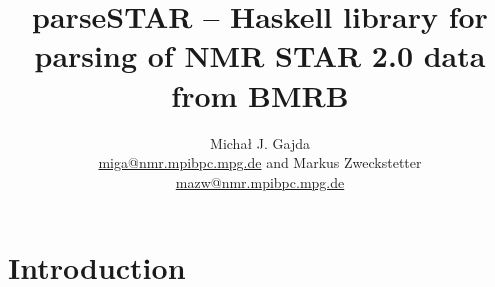 \documentclass[font=Times]{article}
\author{Micha\l{} J. Gajda\\\url{miga@nmr.mpibpc.mpg.de} and
Markus Zweckstetter\\\url{mazw@nmr.mpibpc.mpg.de}
}
\title{parseSTAR -- Haskell library for parsing of NMR STAR 2.0 data from BMRB}
\begin{document}
\maketitle{}

\begin{abstract}


\end{abstract}

\section{Introduction}



\end{document}
